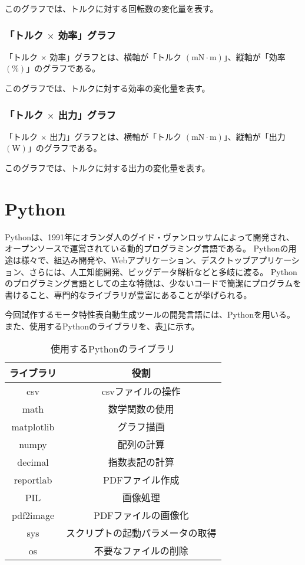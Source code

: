 このグラフでは、トルクに対する回転数の変化量を表す。
\subsubsection{「トルク $\times$ 効率」グラフ}\label{sub:sub:torkouritu}
「トルク $\times$ 効率」グラフとは、横軸が「トルク $(\mathrm{mN \cdot m})$」、縦軸が「効率 $(\mathrm{\%})$」のグラフである。

このグラフでは、トルクに対する効率の変化量を表す。
\subsubsection{「トルク $\times$ 出力」グラフ}\label{sub:sub:torsyutu}
「トルク $\times$ 出力」グラフとは、横軸が「トルク $(\mathrm{mN \cdot m})$」、縦軸が「出力 $(\mathrm{W})$」のグラフである。

このグラフでは、トルクに対する出力の変化量を表す。
\section{Python}\label{python}
Pythonは、1991年にオランダ人のグイド・ヴァンロッサムによって開発され、オープンソースで運営されている動的プログラミング言語である\cite{pythonoya}。
Pythonの用途は様々で、組込み開発や、Webアプリケーション、デスクトップアプリケーション、さらには、人工知能開発、ビッグデータ解析などと多岐に渡る\cite{pythonsamu}。
Pythonのプログラミング言語としての主な特徴は、少ないコードで簡潔にプログラムを書けること、専門的なライブラリが豊富にあることが挙げられる。

今回試作するモータ特性表自動生成ツールの開発言語には、Pythonを用いる。
また、使用するPythonのライブラリを、表\ref{tab:libr}に示す。
\begin{table}[t]
	\centering
	\caption{使用するPythonのライブラリ}
	\begin{tabular}{|c|c|} \hline
	  ライブラリ & 役割\\ \hline \hline
	  csv & csvファイルの操作 \\ \hline
	  math &  数学関数の使用\\ \hline
	  matplotlib & グラフ描画\\ \hline
	  numpy &  配列の計算\\ \hline
	  decimal &  指数表記の計算\\ \hline
	  reportlab & PDFファイル作成 \\ \hline
	  PIL &  画像処理\\ \hline
	  pdf2image &  PDFファイルの画像化\\ \hline
	  sys & スクリプトの起動パラメータの取得\\ \hline
	  os &  不要なファイルの削除\\ \hline
	\end{tabular}
	\label{tab:libr}
  \end{table}

